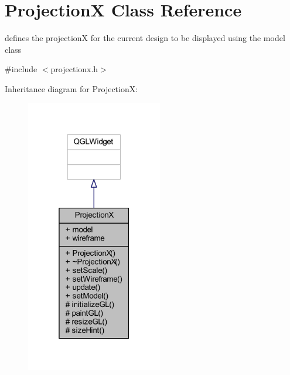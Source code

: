 \hypertarget{class_projection_x}{}\section{ProjectionX Class Reference}
\label{class_projection_x}


defines the projectionX for the current design to be displayed using the model class  




{\ttfamily \#include $<$projectionx.\+h$>$}



Inheritance diagram for ProjectionX\+:\nopagebreak
\begin{figure}[H]
\begin{center}
\leavevmode
\includegraphics[width=169pt]{class_projection_x__inherit__graph}
\end{center}
\end{figure}


